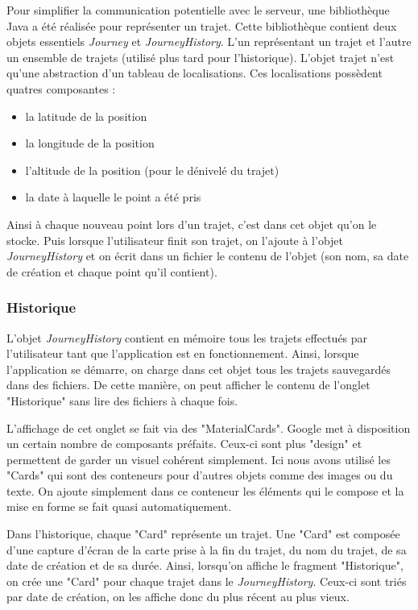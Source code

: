 Pour simplifier la communication potentielle avec le serveur, une bibliothèque Java a été réalisée pour représenter un trajet. Cette bibliothèque
contient deux objets essentiels \emph{Journey} et \emph{JourneyHistory}. L'un représentant un trajet et l'autre un ensemble de trajets
(utilisé plus tard pour l'historique). L'objet trajet n'est qu'une abstraction d'un tableau de localisations. Ces localisations possèdent
quatres composantes :
\begin{itemize}
  \item la latitude de la position
  \item la longitude de la position
  \item l'altitude de la position (pour le dénivelé du trajet)
  \item la date à laquelle le point a été pris
\end{itemize}
Ainsi à chaque nouveau point lors d'un trajet, c'est dans cet objet qu'on le stocke. Puis lorsque l'utilisateur finit son trajet,
on l'ajoute à l'objet \emph{JourneyHistory} et on écrit dans un fichier le contenu de l'objet (son nom, sa date de création et chaque
point qu'il contient).

\subsubsection{Historique}
L'objet \emph{JourneyHistory} contient en mémoire tous les trajets effectués par l'utilisateur tant que l'application est en fonctionnement.
Ainsi, lorsque l'application se démarre, on charge dans cet objet tous les trajets sauvegardés dans des fichiers. De cette manière, on peut
afficher le contenu de l'onglet "Historique" sans lire des fichiers à chaque fois.

L'affichage de cet onglet se fait via des "MaterialCards". Google met à disposition un certain nombre de composants préfaits. Ceux-ci sont
plus "design" et permettent de garder un visuel cohérent simplement. Ici nous avons utilisé les "Cards" qui sont des conteneurs pour d'autres
objets comme des images ou du texte. On ajoute simplement dans ce conteneur les éléments qui le compose et la mise en forme se fait quasi
automatiquement.

Dans l'historique, chaque "Card" représente un trajet. Une "Card" est composée d'une capture d'écran de la carte prise à la fin du trajet,
du nom du trajet, de sa date de création et de sa durée. Ainsi, lorsqu'on affiche le fragment "Historique", on crée une "Card" pour
chaque trajet dans le \emph{JourneyHistory}. Ceux-ci sont triés par date de création, on les affiche donc du plus récent au plus vieux.

